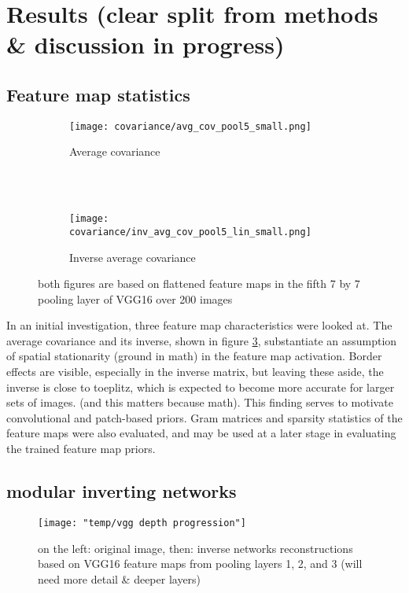 \documentclass{article}
\begin{document}
\section{Results (clear split from methods \& discussion in progress)}

\subsection{Feature map statistics}


\begin{figure}
	\centering
	\begin{subfigure}[b]{0.3\textwidth}
		\texttt{[image: covariance/avg\_cov\_pool5\_small.png]}
		\caption{Average covariance \\~}
		\label{fig:cov}
	\end{subfigure}
	~
	\begin{subfigure}[b]{0.3\textwidth}
		\texttt{[image: covariance/inv\_avg\_cov\_pool5\_lin\_small.png]}
		\caption{Inverse average covariance}
		\label{fig:inv_cov}
	\end{subfigure}
	\caption{both figures are based on flattened feature maps in the fifth 7 by 7 pooling layer of VGG16 over 200 images}
	\label{fig:cov_plots}
\end{figure}

In an initial investigation, three feature map characteristics were looked at. The average covariance and its inverse, shown in figure \ref{fig:cov_plots}, substantiate an assumption of spatial stationarity (ground in math) in the feature map activation. Border effects are visible, especially in the inverse matrix, but leaving these aside, the inverse is close to toeplitz, which is expected to become more accurate for larger sets of images. (and this matters because math). This finding serves to motivate convolutional and patch-based priors. Gram matrices and sparsity statistics of the feature maps were also evaluated, and may be used at a later stage in evaluating the trained feature map priors.

\subsection{modular inverting networks}

\begin{figure}
	\centering
	\texttt{[image: "temp/vgg depth progression"]}
	\caption{on the left: original image, then: inverse networks reconstructions based on VGG16 feature maps from pooling layers 1, 2, and 3 (will need more detail \& deeper layers)}
	\label{fig:invert_net_progression}
\end{figure}
\end{document}
